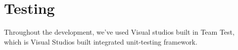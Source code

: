 \chapter{Testing}
\label{chap:testing}

Throughout the development, we've used Visual studios built in Team Test, which is Visual Studios built integrated unit-testing framework. \cite{teamtest}

